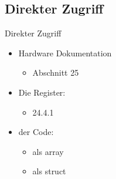 \subsection{Direkter Zugriff}
\begin{frame}{Direkter Zugriff}
 \begin{itemize}
  \item Hardware Dokumentation 
  \begin{itemize}
   \item {} Abschnitt 25
  \end{itemize}
  \item Die Register:
  \begin{itemize}
    \item {} 24.4.1
  \end{itemize}
  \item der Code:
  \begin{itemize}
   \item {} als array
   \item {} als struct
  \end{itemize}
 \end{itemize}
\end{frame}
